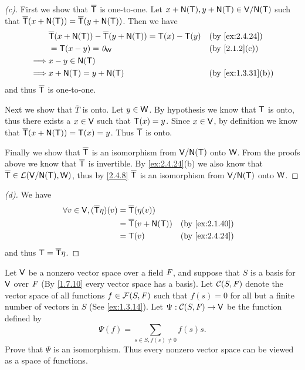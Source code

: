 \begin{proof}[(c)]
  First we show that \(\overline{\mathsf{T}}\) is one-to-one.
  Let \(x + \ns{\T}, y + \ns{\T} \in \V / \ns{\T}\) such that \(\overline{\T}(x + \ns{\T}) = \overline{\T}(y + \ns{\T})\).
  Then we have
  \begin{align*}
             & \overline{\T}(x + \ns{\T}) - \overline{\T}(y + \ns{\T}) = \T(x) - \T(y) &  & \by{ex:2.4.24}    \\
             & = \T(x - y) = \zv_{\W}                                                  &  & \by{2.1.2}[c]     \\
    \implies & x - y \in \ns{\T}                                                                              \\
    \implies & x + \ns{\T} = y + \ns{\T}                                               &  & \by{ex:1.3.31}[b]
  \end{align*}
  and thus \(\overline{\mathsf{T}}\) is one-to-one.

  Next we show that \(\overline{T}\) is onto.
  Let \(y \in \mathsf{W}\).
  By hypothesis we know that \(\mathsf{T}\) is onto, thus there exists a \(x \in \mathsf{V}\) such that \(\mathsf{T}(x) = y\).
  Since \(x \in \mathsf{V}\), by definition we know that \(\overline{\T}(x + \ns{\T}) = \T(x) = y\).
  Thus \(\overline{\mathsf{T}}\) is onto.

  Finally we show that \(\overline{\mathsf{T}}\) is an isomorphism from \(\V / \ns{\T}\) onto \(\mathsf{W}\).
  From the proofs above we know that \(\overline{\mathsf{T}}\) is invertible.
  By \cref{ex:2.4.24}(b) we also know that \(\overline{\T} \in \ls(\V / \ns{\T}, \W)\), thus by \cref{2.4.8} \(\overline{\mathsf{T}}\) is an isomorphism from \(\V / \ns{\T}\) onto \(\mathsf{W}\).
\end{proof}

\begin{proof}[(d)]
  We have
  \begin{align*}
    \forall v \in \V, (\overline{\T} \eta)(v) & = \overline{\T}(\eta(v))                         \\
                                              & = \overline{\T}(v + \ns{\T}) &  & \by{ex:2.1.40} \\
                                              & = \T(v)                      &  & \by{ex:2.4.24}
  \end{align*}
  and thus \(\mathsf{T} = \overline{\mathsf{T}} \eta\).
\end{proof}

\begin{ex}\label{ex:2.4.25}
  Let \(\mathsf{V}\) be a nonzero vector space over a field \(\mathit{F}\), and suppose that \(S\) is a basis for \(\mathsf{V}\) over \(\mathit{F}\)
  (By \cref{1.7.10} every vector space has a basis).
  Let \(\mathcal{C}(S, \mathit{F})\) denote the vector space of all functions \(f \in \mathcal{F}(S, \mathit{F})\) such that \(f(s) = 0\) for all but a finite number of vectors in \(S\)
  (See \cref{ex:1.3.14}).
  Let \(\Psi : \mathcal{C}(S, \mathit{F}) \to \mathsf{V}\) be the function defined by
  \[
    \Psi(f) = \sum_{s \in S, f(s) \neq 0} f(s) s.
  \]
  Prove that \(\Psi\) is an isomorphism.
  Thus every nonzero vector space can be viewed as a space of functions.
\end{ex}

